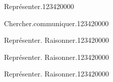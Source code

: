   



\begin{pageParcoursd} 
 
\begin{ExoCd}{Représenter.}{1234}{2}{0}{0}{0}{0}


 
\end{ExoCd}

 
\begin{ExoCd}{Chercher.communiquer.}{1234}{2}{0}{0}{0}{0}



\end{ExoCd}


\begin{ExoCd}{Représenter. Raisonner.}{1234}{2}{0}{0}{0}{0}


\end{ExoCd}

\begin{ExoCd}{Représenter. Raisonner.}{1234}{2}{0}{0}{0}{0}


\end{ExoCd}
 
\begin{ExoCd}{Représenter. Raisonner.}{1234}{2}{0}{0}{0}{0}


\end{ExoCd}
 
\end{pageParcoursd}

